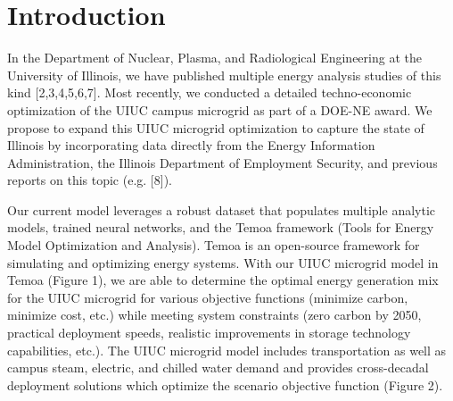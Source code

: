 \section{Introduction}
In the Department of Nuclear, Plasma, and Radiological Engineering at the 
University of Illinois, we have published multiple energy analysis studies of 
this kind [2,3,4,5,6,7]. Most recently, we conducted a detailed techno-economic 
optimization of the UIUC campus microgrid as part of a DOE-NE award. We propose 
to expand this UIUC microgrid optimization to capture the state of Illinois by 
incorporating data directly from the Energy Information Administration, the 
Illinois Department of Employment Security, and previous reports on this topic 
(e.g. [8]).

Our current model leverages a robust dataset that populates multiple analytic 
models, trained neural networks, and  the Temoa framework (Tools for Energy 
Model Optimization and Analysis). Temoa is an open-source framework for 
simulating and optimizing energy systems. With our UIUC microgrid model in 
Temoa (Figure 1), we are able to determine the optimal energy generation mix 
for the UIUC microgrid for various objective functions (minimize carbon, 
minimize cost, etc.) while meeting system constraints (zero carbon by 2050, 
practical deployment speeds, realistic improvements in storage technology 
capabilities, etc.). The UIUC microgrid model includes transportation as well 
as campus steam, electric, and chilled water demand and provides cross-decadal 
deployment solutions which optimize the scenario objective function (Figure 2).

